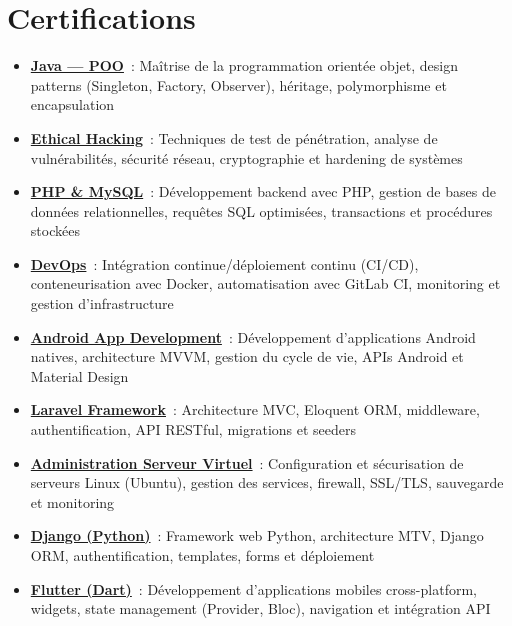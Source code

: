 \documentclass[12pt, a4paper]{article}
\begin{document}
\section{Certifications}

\begin{itemize}[leftmargin=1.4em, itemsep=3pt, topsep=2pt, parsep=0pt]
  \item \href{https://ude.my/UC-41275521-f919-4f97-8a8b-3cd39850f307}{\textbf{Java --- POO}}~: Ma\^itrise de la programmation orient\'ee objet, design patterns (Singleton, Factory, Observer), h\'eritage, polymorphisme et encapsulation
  
  \item \href{https://ude.my/UC-28973039-144f-4a55-8ad1-03d228dbc5f5}{\textbf{Ethical Hacking}}~: Techniques de test de p\'en\'etration, analyse de vuln\'erabilit\'es, s\'ecurit\'e r\'eseau, cryptographie et hardening de syst\`emes
  
  \item \href{https://ude.my/UC-01418bd3-a427-4926-8b06-74444c240ca3}{\textbf{PHP \& MySQL}}~: D\'eveloppement backend avec PHP, gestion de bases de donn\'ees relationnelles, requ\^etes SQL optimis\'ees, transactions et proc\'edures stock\'ees
  
  \item \href{https://www.udemy.com/certificate/UC-81a3e6ea-8378-444d-a94c-38f8d830abe1/}{\textbf{DevOps}}~: Int\'egration continue/d\'eploiement continu (CI/CD), conteneurisation avec Docker, automatisation avec GitLab CI, monitoring et gestion d'infrastructure
  
  \item \href{https://www.udemy.com/certificate/UC-a31618cb-7a18-4643-8fe1-c991f1b5ec6a/}{\textbf{Android App Development}}~: D\'eveloppement d'applications Android natives, architecture MVVM, gestion du cycle de vie, APIs Android et Material Design
  
  \item \href{https://www.udemy.com/certificate/UC-70efe319-c87c-4263-8373-7bc4b32f9cf7/}{\textbf{Laravel Framework}}~: Architecture MVC, Eloquent ORM, middleware, authentification, API RESTful, migrations et seeders
  
  \item \href{https://www.udemy.com/certificate/UC-a563b0dc-418f-45a0-b526-267918b07762/}{\textbf{Administration Serveur Virtuel}}~: Configuration et s\'ecurisation de serveurs Linux (Ubuntu), gestion des services, firewall, SSL/TLS, sauvegarde et monitoring
  
  \item \href{https://www.udemy.com/certificate/UC-e4422023-18ea-48d9-a0de-1cc5085914dc/}{\textbf{Django (Python)}}~: Framework web Python, architecture MTV, Django ORM, authentification, templates, forms et d\'eploiement
  
  \item \href{https://www.udemy.com/certificate/UC-93fed8bd-bd65-4b4b-8e0d-f3ea1fe71ed5/}{\textbf{Flutter (Dart)}}~: D\'eveloppement d'applications mobiles cross-platform, widgets, state management (Provider, Bloc), navigation et int\'egration API
\end{itemize}
\end{document}
